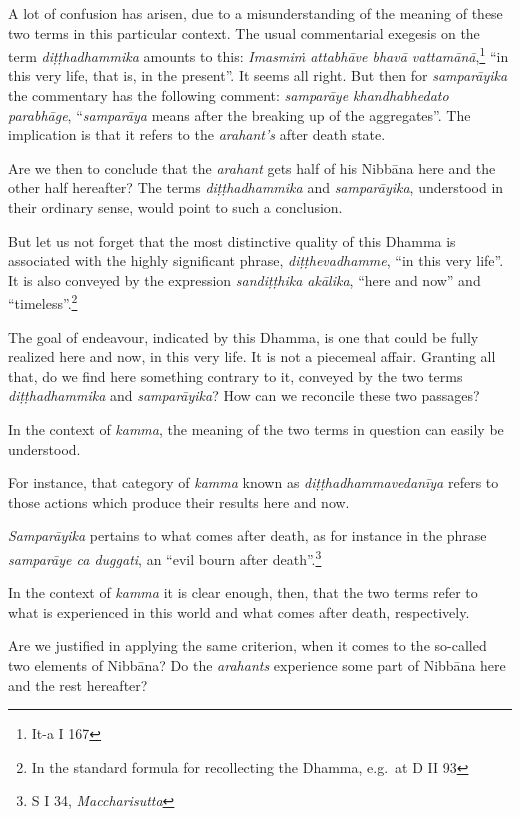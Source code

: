 A lot of confusion has arisen, due to a misunderstanding of the meaning of these two terms in this particular context. The usual commentarial exegesis on the term \emph{diṭṭhadhammika} amounts to this: \emph{Imasmiṁ attabhāve bhavā vattamānā},\footnote{It-a I 167} ``in this very life, that is, in the present''. It seems all right. But then for \emph{samparāyika} the commentary has the following comment: \emph{samparāye khandhabhedato parabhāge}, ``\emph{samparāya} means after the breaking up of the aggregates''. The implication is that it refers to the \emph{arahant's} after death state.

Are we then to conclude that the \emph{arahant} gets half of his Nibbāna here and the other half hereafter? The terms \emph{diṭṭhadhammika} and \emph{samparāyika}, understood in their ordinary sense, would point to such a conclusion.

But let us not forget that the most distinctive quality of this Dhamma is associated with the highly significant phrase, \emph{diṭṭhevadhamme}, ``in this very life''. It is also conveyed by the expression \emph{sandiṭṭhika akālika}, ``here and now'' and ``timeless''.\footnote{In the standard formula for recollecting the Dhamma, e.g.~at D II 93}

The goal of endeavour, indicated by this Dhamma, is one that could be fully realized here and now, in this very life. It is not a piecemeal affair. Granting all that, do we find here something contrary to it, conveyed by the two terms \emph{diṭṭhadhammika} and \emph{samparāyika}? How can we reconcile these two passages?

In the context of \emph{kamma}, the meaning of the two terms in question can easily be understood.

For instance, that category of \emph{kamma} known as \emph{diṭṭhadhammavedanīya} refers to those actions which produce their results here and now.

\emph{Samparāyika} pertains to what comes after death, as for instance in the phrase \emph{samparāye ca duggati}, an ``evil bourn after death''.\footnote{S I 34, \emph{Maccharisutta}}

In the context of \emph{kamma} it is clear enough, then, that the two terms refer to what is experienced in this world and what comes after death, respectively.

Are we justified in applying the same criterion, when it comes to the so-called two elements of Nibbāna? Do the \emph{arahants} experience some part of Nibbāna here and the rest hereafter?

